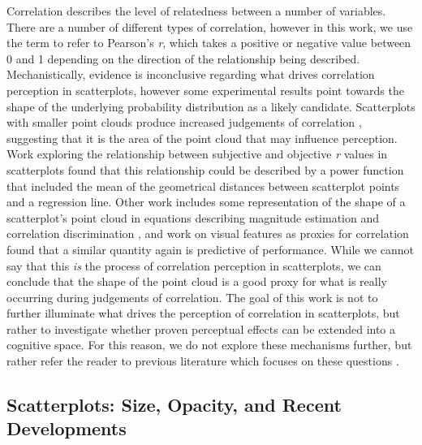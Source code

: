 \documentclass[manuscript,screen,review]{acmart}
\begin{document}
Correlation describes the level of relatedness between a number of
variables. There are a number of different types of correlation, however
in this work, we use the term to refer to Pearson's \emph{r}, which
takes a positive or negative value between 0 and 1 depending on the
direction of the relationship being described. Mechanistically, evidence
is inconclusive regarding what drives correlation perception in
scatterplots, however some experimental results point towards the shape
of the underlying probability distribution as a likely candidate.
Scatterplots with smaller point clouds produce increased judgements of
correlation \citep{cleveland_1982}, suggesting that it is the area of
the point cloud that may influence perception. Work exploring the
relationship between subjective and objective \emph{r} values in
scatterplots found that this relationship could be described by a power
function that included the mean of the geometrical distances between
scatterplot points and a regression line. Other work includes some
representation of the shape of a scatterplot's point cloud in equations
describing magnitude estimation and correlation discrimination
\citep{meyer_1997, rensink_2017}, and work on visual features as proxies
for correlation found that a similar quantity again is predictive of
performance. While we cannot say that this \emph{is} the process of
correlation perception in scatterplots, we can conclude that the shape
of the point cloud is a good proxy for what is really occurring during
judgements of correlation. The goal of this work is not to further
illuminate what drives the perception of correlation in scatterplots,
but rather to investigate whether proven perceptual effects can be
extended into a cognitive space. For this reason, we do not explore
these mechanisms further, but rather refer the reader to previous
literature which focuses on these questions
\citep{rensink_2010, rensink_2017, strain_2023, strain_2024}.

\subsection{Scatterplots: Size, Opacity, and Recent
Developments}\label{sec-scatterplots}
\end{document}
